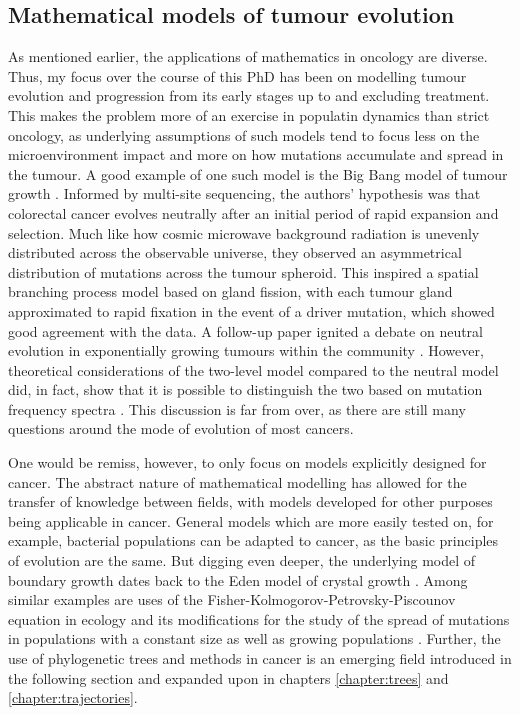 \subsection{Mathematical models of tumour evolution}
As mentioned earlier, the applications of mathematics in oncology are diverse.
Thus, my focus over the course of this PhD has been on modelling tumour
evolution and progression from its early stages up to and excluding treatment.
This makes the problem more of an exercise in populatin dynamics than strict
oncology, as underlying assumptions of such models tend to focus less on the
microenvironment impact and more on how mutations accumulate and spread in the
tumour. A good example of one such model is the Big Bang model of tumour growth
\cite{sottoriva_big_2015}. Informed by multi-site sequencing, the authors'
hypothesis was that colorectal cancer evolves neutrally after an initial period
of rapid expansion and selection. Much like how cosmic microwave background
radiation is unevenly distributed across the observable universe, they observed
an asymmetrical distribution of mutations across the tumour spheroid. This
inspired a spatial branching process model based on gland fission, with each
tumour gland approximated to rapid fixation in the event of a driver mutation,
which showed good agreement with the data. A follow-up paper
\cite{williams_identification_2016} ignited a debate on neutral evolution in
exponentially growing tumours within the community
\cite{tarabichi_neutral_2018, mcdonald_currently_2018, heide_reply_2018,
bozic_measuring_2019}. However, theoretical considerations of the two-level
model compared to the neutral model did, in fact, show that it is possible to
distinguish the two based on mutation frequency spectra
\cite{tung_signatures_2021}. This discussion is far from over, as there are
still many questions around the mode of evolution of most cancers.\par
One would be remiss, however, to only focus on models explicitly designed for
cancer. The abstract nature of mathematical modelling has allowed for the
transfer of knowledge between fields, with models developed for other purposes
being applicable in cancer. General models which are more easily tested on, for
example, bacterial populations \cite{fusco_excess_2016, schreck_impact_2023}
can be adapted to cancer, as the basic principles of evolution are the same.
But digging even deeper, the underlying model of boundary growth dates back to
the Eden model of crystal growth \cite{eden_two-dimensional_1961}. Among
similar examples are uses of the Fisher-Kolmogorov-Petrovsky-Piscounov equation
in ecology and its modifications for the study of the spread of mutations in
populations with a constant size \cite{houchmandzadeh_fisher_2017} as well as
growing populations \cite{wodarz_mutant_2020}. Further, the use of phylogenetic
trees and methods in cancer is an emerging field introduced in the following
section and expanded upon in chapters \ref{chapter:trees} and
\ref{chapter:trajectories}.


